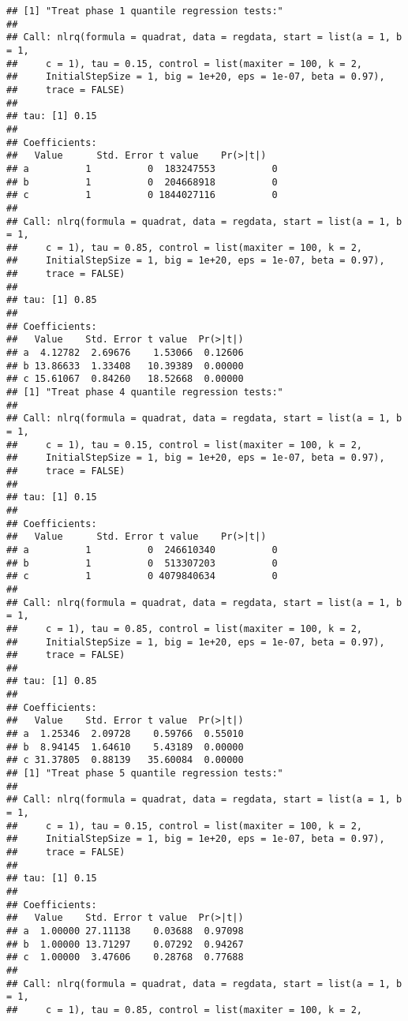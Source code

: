 \documentclass[
]{article}
\begin{document}
\begin{verbatim}
## [1] "Treat phase 1 quantile regression tests:"
## 
## Call: nlrq(formula = quadrat, data = regdata, start = list(a = 1, b = 1, 
##     c = 1), tau = 0.15, control = list(maxiter = 100, k = 2, 
##     InitialStepSize = 1, big = 1e+20, eps = 1e-07, beta = 0.97), 
##     trace = FALSE)
## 
## tau: [1] 0.15
## 
## Coefficients:
##   Value      Std. Error t value    Pr(>|t|)  
## a          1          0  183247553          0
## b          1          0  204668918          0
## c          1          0 1844027116          0
## 
## Call: nlrq(formula = quadrat, data = regdata, start = list(a = 1, b = 1, 
##     c = 1), tau = 0.85, control = list(maxiter = 100, k = 2, 
##     InitialStepSize = 1, big = 1e+20, eps = 1e-07, beta = 0.97), 
##     trace = FALSE)
## 
## tau: [1] 0.85
## 
## Coefficients:
##   Value    Std. Error t value  Pr(>|t|)
## a  4.12782  2.69676    1.53066  0.12606
## b 13.86633  1.33408   10.39389  0.00000
## c 15.61067  0.84260   18.52668  0.00000
## [1] "Treat phase 4 quantile regression tests:"
## 
## Call: nlrq(formula = quadrat, data = regdata, start = list(a = 1, b = 1, 
##     c = 1), tau = 0.15, control = list(maxiter = 100, k = 2, 
##     InitialStepSize = 1, big = 1e+20, eps = 1e-07, beta = 0.97), 
##     trace = FALSE)
## 
## tau: [1] 0.15
## 
## Coefficients:
##   Value      Std. Error t value    Pr(>|t|)  
## a          1          0  246610340          0
## b          1          0  513307203          0
## c          1          0 4079840634          0
## 
## Call: nlrq(formula = quadrat, data = regdata, start = list(a = 1, b = 1, 
##     c = 1), tau = 0.85, control = list(maxiter = 100, k = 2, 
##     InitialStepSize = 1, big = 1e+20, eps = 1e-07, beta = 0.97), 
##     trace = FALSE)
## 
## tau: [1] 0.85
## 
## Coefficients:
##   Value    Std. Error t value  Pr(>|t|)
## a  1.25346  2.09728    0.59766  0.55010
## b  8.94145  1.64610    5.43189  0.00000
## c 31.37805  0.88139   35.60084  0.00000
## [1] "Treat phase 5 quantile regression tests:"
## 
## Call: nlrq(formula = quadrat, data = regdata, start = list(a = 1, b = 1, 
##     c = 1), tau = 0.15, control = list(maxiter = 100, k = 2, 
##     InitialStepSize = 1, big = 1e+20, eps = 1e-07, beta = 0.97), 
##     trace = FALSE)
## 
## tau: [1] 0.15
## 
## Coefficients:
##   Value    Std. Error t value  Pr(>|t|)
## a  1.00000 27.11138    0.03688  0.97098
## b  1.00000 13.71297    0.07292  0.94267
## c  1.00000  3.47606    0.28768  0.77688
## 
## Call: nlrq(formula = quadrat, data = regdata, start = list(a = 1, b = 1, 
##     c = 1), tau = 0.85, control = list(maxiter = 100, k = 2, 

\end{verbatim}
\end{document}

